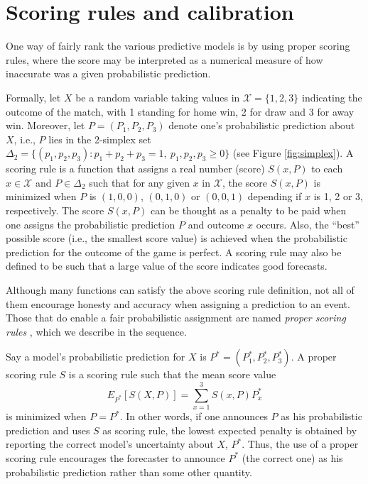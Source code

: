 \documentclass[journal,article,accept,moreauthors,pdftex,12pt,a4paper]{mdpi}
\begin{document}
    {\color{red}\section{Scoring rules and calibration}
    \label{sec::scoring}

    One way of fairly rank the various predictive models is by using proper scoring rules, where
    the score may be interpreted as a numerical measure of how inaccurate was a given probabilistic prediction.

    Formally, let $X$ be a random variable
    taking values in $\mathcal{X}=\{1,2,3\}$ indicating
    the outcome of the match, with 1 standing for home win, 2 for draw and 3 for away win.  Moreover, let $P=(P_1,P_2,P_3)$ denote one's probabilistic prediction
    about $X$, i.e., $P$ lies in the 2-simplex set $\Delta_2=\{(p_1,p_2,p_3):p_1+p_2+p_3=1, \ p_1,p_2,p_3\geq0\}$ (see Figure
    \ref{fig:simplex}).
    A scoring rule is a function
    that assigns a real number (score) $S(x,P)$ to each $x \in \mathcal{X}$
    and $P \in \Delta_2$
    such that
    for any given $x$ in $\mathcal{X}$, the score  $S(x,P)$ is minimized when $P$ is
    $(1,0,0)$, $(0,1,0)$ or $(0,0,1)$ depending if $x$ is 1, 2 or 3, respectively.
    The score $S(x,P)$ can be thought as
    a penalty to be paid when one assigns the
    probabilistic prediction $P$ and outcome
    $x$ occurs. Also, the ``best'' possible score (i.e., the smallest score value) is achieved when the probabilistic prediction for the outcome of the game is perfect. A scoring rule may also be defined to be such that a large value of the score indicates good forecasts.
        
    Although many functions can satisfy the above scoring rule definition, not all of them encourage honesty and accuracy when assigning a prediction to an event. Those that do enable a fair probabilistic assignment are named \emph{proper scoring rules} \cite{lad}, which we describe in the sequence.

    Say a model's probabilistic prediction for $X$ is $P^*=(P_1^*,P_2^*,P_3^*).$ A proper scoring rule $S$ is a scoring rule  such that the mean score value
    $$E_{P^*}[S(X,P)]=\sum_{x=1}^3 S(x,P)P^*_x$$
     is minimized when $P=P^*$.
    In other words, if one announces
    $P$ as his probabilistic prediction
    and uses $S$ as scoring rule, the lowest
    expected penalty is obtained by reporting the correct model's  uncertainty about $X$, $P^*$.
    Thus, the use of a proper scoring rule encourages the forecaster to announce $P^*$ (the correct one)
    as his probabilistic prediction  rather than some other quantity.}
\end{document}
